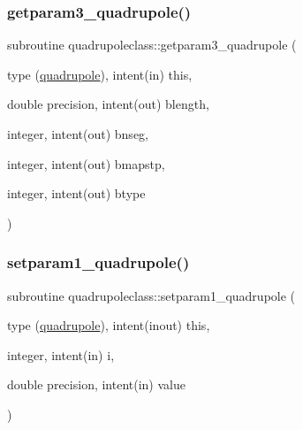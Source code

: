 \mbox{\label{namespacequadrupoleclass_ae5c8a42ae81e07dcb9eb91681d28f04e}} 
\subsubsection{\texorpdfstring{getparam3\_quadrupole()}{getparam3\_quadrupole()}}
{\footnotesize\ttfamily subroutine quadrupoleclass\+::getparam3\+\_\+quadrupole (\begin{DoxyParamCaption}\item[{type (\mbox{\hyperlink{namespacequadrupoleclass_structquadrupoleclass_1_1quadrupole}{quadrupole}}), intent(in)}]{this,  }\item[{double precision, intent(out)}]{blength,  }\item[{integer, intent(out)}]{bnseg,  }\item[{integer, intent(out)}]{bmapstp,  }\item[{integer, intent(out)}]{btype }\end{DoxyParamCaption})}

\mbox{\label{namespacequadrupoleclass_a34d611929c447e03e1c12c2f72888ca5}} 
\subsubsection{\texorpdfstring{setparam1\_quadrupole()}{setparam1\_quadrupole()}}
{\footnotesize\ttfamily subroutine quadrupoleclass\+::setparam1\+\_\+quadrupole (\begin{DoxyParamCaption}\item[{type (\mbox{\hyperlink{namespacequadrupoleclass_structquadrupoleclass_1_1quadrupole}{quadrupole}}), intent(inout)}]{this,  }\item[{integer, intent(in)}]{i,  }\item[{double precision, intent(in)}]{value }\end{DoxyParamCaption})}

\mbox{\label{namespacequadrupoleclass_a400dc2305f0aca6ab6d6b5475a91363a}} 
